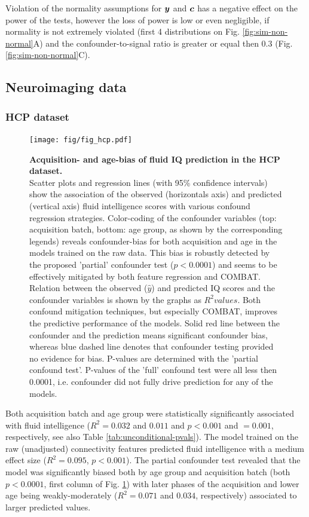 \documentclass{article}
\begin{document}
Violation of the normality assumptions for $\boldsymbol{y}$ and $\boldsymbol{c}$ has a negative effect on the power of the tests, however the loss of power is low or even negligible, if normality is not extremely violated (first 4 distributions on Fig. \ref{fig:sim-non-normal}A) and the confounder-to-signal ratio is greater or equal then 0.3 (Fig. \ref{fig:sim-non-normal}C).

\subsection{Neuroimaging data}
\subsubsection*{HCP dataset}

\begin{figure}[!b]
  \centering
  \texttt{[image: fig/fig\_hcp.pdf]}
  \caption{\textbf{Acquisition- and age-bias of fluid IQ prediction in the HCP dataset.} \\
  Scatter plots and regression lines (with 95\% confidence intervals) show the association of the observed (horizontals axis) and predicted (vertical axis) fluid intelligence scores with various confound regression strategies. Color-coding of the confounder variables (top: acquisition batch, bottom: age group, as shown by the corresponding legends) reveals confounder-bias for both acquisition and age in the models trained on the raw data. This bias is robustly detected by the proposed 'partial' confounder test ($p<0.0001$) and seems to be effectively mitigated by both feature regression and COMBAT.
  Relation between the observed ($\hat{y}$) and predicted IQ scores and the confounder variables is shown by the graphs as $R^2 values$. Both confound mitigation techniques, but especially COMBAT, improves the predictive performance of the models.
  Solid red line between the confounder and the prediction means significant confounder bias, whereas blue dashed line denotes that confounder testing provided no evidence for bias. P-values are determined with the 'partial confound test'. P-values of the 'full' confound test were all less then 0.0001, i.e. confounder did not fully drive prediction for any of the models.
  }
  \label{fig:hcp}
\end{figure}

Both acquisition batch and age group were statistically significantly associated with fluid intelligence ($R^2=0.032$ and $0.011$ and $p<0.001$ and $=0.001$, respectively, see also Table \ref{tab:unconditional-pvals}). The model trained on the raw (unadjusted) connectivity features predicted fluid intelligence with a medium effect size ($R^2=0.095$, $p<0.001$).
The partial confounder test revealed that the model was significantly biased both by age group and acquisition batch (both $p<0.0001$, first column of Fig. \ref{fig:hcp}) with later phases of the acquisition and lower age being weakly-moderately ($R^2=0.071$ and $0.034$, respectively) associated to larger predicted values.
\end{document}
